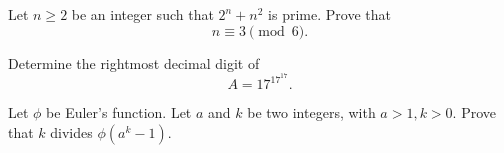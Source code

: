\begin{problem}
	Let $n\geq 2$ be an integer such that $2^n + n^2$ is prime. Prove that
	\[
		n \equiv 3 \pmod{6}.
	\]
\end{problem}

\begin{problem}
	Determine the rightmost decimal digit of
	\[
		A = 17^{17^17}.
	\]
\end{problem}

\begin{problem}
	Let $\phi$ be Euler's function. Let $a$ and $k$ be two integers, with $a>1,k>0$. Prove that $k$ divides $\phi(a^k-1)$.
\end{problem}